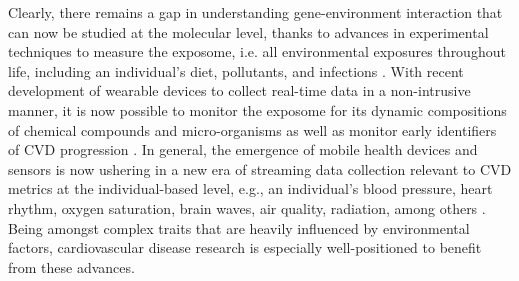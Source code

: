 \documentclass[letter]{bioinfo}
\begin{document}
	Clearly, there remains a gap in understanding gene-environment interaction that can now be studied at the molecular level, thanks to advances in experimental techniques to measure the exposome, i.e. all environmental exposures throughout life, including an individual's diet, pollutants, and infections \citep{Wild:2005:Complementing}. With recent development of wearable devices to collect real-time data in a non-intrusive manner, it is now possible to monitor the exposome for its dynamic compositions of chemical compounds and micro-organisms \citep{Warth:2017:ExposomeScale, Jiang:2018:Dynamic} as well as monitor early identifiers of CVD progression \citep{McConnell:2017:Feasibility,Shah:2015:phenomapping}.  In general, the emergence of mobile health devices and sensors is now ushering in a new era of streaming data collection relevant to CVD metrics at the individual-based level, e.g., an individual's blood pressure, heart rhythm, oxygen saturation, brain waves, air quality, radiation, among others \citep{Kellogg:2018:Personal}.  Being amongst complex traits that are heavily influenced by environmental factors, cardiovascular disease research is especially well-positioned to benefit from these advances.
	
\end{document}
